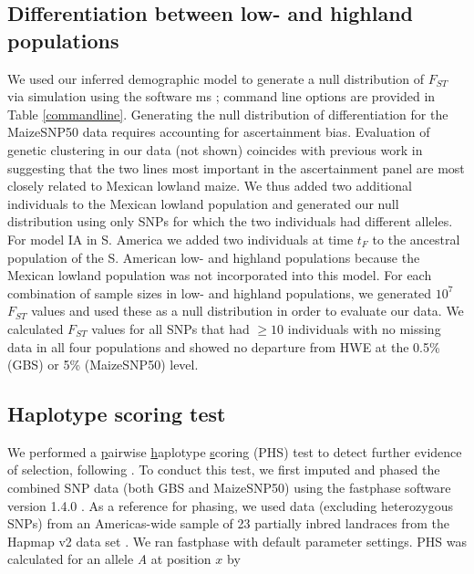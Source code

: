\subsection*{Differentiation between low- and highland populations}
We used our inferred demographic model to generate a null distribution of $F_{ST}$ via simulation using the software {\sf ms} \cite[]{Hudson_2002_11847089}; command line options are provided in Table \ref{commandline}.  
Generating the null distribution of differentiation for the MaizeSNP50 data requires accounting for ascertainment bias. 
Evaluation of genetic clustering in our data (not shown) coincides with previous work \cite[]{Hufford_2012_22660546} in suggesting that the two lines most important in the ascertainment panel are most closely related to Mexican lowland maize.  
We thus added two additional individuals to the Mexican lowland population and generated our null distribution using only SNPs for which the two individuals had different alleles. For model IA in S. America we added two individuals at time $t_F$ to the ancestral population of the S. American low- and highland populations because the Mexican lowland population was not incorporated into this model. 
For each combination of sample sizes in low- and highland populations, we generated $10^7$ $F_{ST}$ values and used these as a null distribution in order to evaluate our data.   
We calculated $F_{ST}$ values for all SNPs that had $\geq10$ individuals with no missing data in all four populations and showed no departure from HWE at the 0.5\% (GBS) or 5\% (MaizeSNP50) level. 

\subsection*{Haplotype scoring test}
We performed a \underline{p}airwise \underline{h}aplotype \underline{s}coring (PHS) test to detect further evidence of selection, following \cite{Toomajian_2006_16623598}.  
To conduct this test, we first imputed and phased the combined SNP data (both GBS and MaizeSNP50) using the {\sf fastphase} software version 1.4.0 \cite[]{Scheet_2006_16532393}.  
As a reference for phasing, we used data (excluding heterozygous SNPs) from an Americas-wide sample of 23 partially inbred landraces from the Hapmap v2 data set  \cite[]{Chia_2012_22660545}.  
We ran {\sf fastphase}  with default parameter settings.  
PHS was calculated for an allele \emph{A} at position $x$ by


